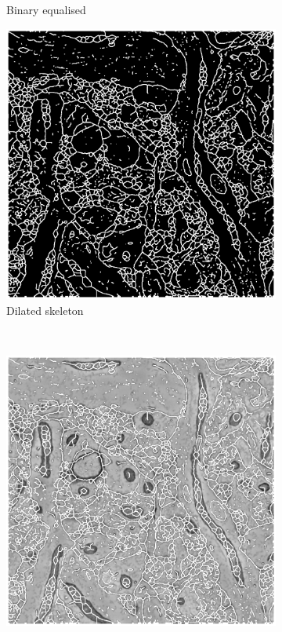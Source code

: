 \documentclass[a4paper, 11pt]{article}
\numberwithin{equation}{section}
\begin{document}
\begin{figure}[!ht]
\begin{subfigure}[t]{.3\textwidth}
				\caption{Binary equalised}
			\end{subfigure}
			\quad
			\begin{subfigure}[t]{.3\textwidth}
				\centering
				\includegraphics[width=\textwidth]{5_dilate}
				\caption{Dilated skeleton}
			\end{subfigure}
			\\
			\begin{subfigure}[t]{.3\textwidth}
				\centering
				\includegraphics[width=\textwidth]{6_membranes_removed}

\end{subfigure}
\end{figure}
\end{document}
